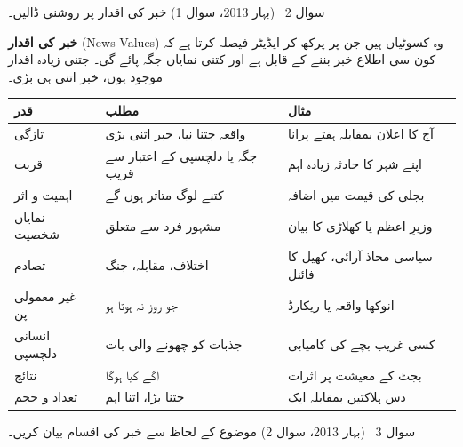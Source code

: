 \begin{sawal}{سوال \textenglish{2} \ \textnormal{\small(بہار \textenglish{2013}، سوال \textenglish{1})}}
خبر کی اقدار پر روشنی ڈالیں۔
\end{sawal}

\begin{hal}
\textbf{خبر کی اقدار} (\textenglish{News Values}) وہ کسوٹیاں ہیں جن پر پرکھ کر
ایڈیٹر فیصلہ کرتا ہے کہ کون سی اطلاع خبر بننے کے قابل ہے اور کتنی نمایاں جگہ
پائے گی۔ جتنی زیادہ اقدار موجود ہوں، خبر اتنی ہی بڑی۔

\medskip
\begin{center}
\begin{tabular}{@{}p{3.2cm} p{5.4cm} p{5.8cm}@{}}
\toprule
\textbf{قدر} & \textbf{مطلب} & \textbf{مثال} \\
\midrule
تازگی & واقعہ جتنا نیا، خبر اتنی بڑی & آج کا اعلان بمقابلہ ہفتے پرانا \\
قربت & جگہ یا دلچسپی کے اعتبار سے قریب & اپنے شہر کا حادثہ زیادہ اہم \\
اہمیت و اثر & کتنے لوگ متاثر ہوں گے & بجلی کی قیمت میں اضافہ \\
نمایاں شخصیت & مشہور فرد سے متعلق & وزیرِ اعظم یا کھلاڑی کا بیان \\
تصادم & اختلاف، مقابلہ، جنگ & سیاسی محاذ آرائی، کھیل کا فائنل \\
غیر معمولی پن & جو روز نہ ہوتا ہو & انوکھا واقعہ یا ریکارڈ \\
انسانی دلچسپی & جذبات کو چھونے والی بات & کسی غریب بچے کی کامیابی \\
نتائج & آگے کیا ہوگا & بجٹ کے معیشت پر اثرات \\
تعداد و حجم & جتنا بڑا، اتنا اہم & دس ہلاکتیں بمقابلہ ایک \\
\bottomrule
\end{tabular}
\end{center}

\end{hal}

\begin{sawal}{سوال \textenglish{3} \ \textnormal{\small(بہار \textenglish{2013}، سوال \textenglish{2})}}
موضوع کے لحاظ سے خبر کی اقسام بیان کریں۔
\end{sawal}

